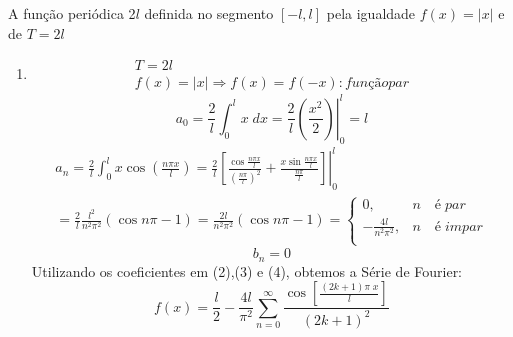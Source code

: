 \documentclass[12pt]{article}
\newcommand*\Eval[3]{\left.#1\right\rvert_{#2}^{#3}}
\begin{document}
\section{}
A função periódica 2$l$ definida no segmento $[-l,l]$ pela igualdade $f(x) = |x|$ e de $T=2l$
\begin{enumerate}[label=S.]
\item
	\begin{equation}
    \begin{split}
    T = 2l\\
    f(x) = |x| \Rightarrow f(x) = f(-x) : função par
    \end{split}\end{equation}
    \begin{equation}
   	a_{0} = \frac{2}{l} \int_{0}^{l} x\; dx = \frac{2}{l} \Eval{\left(\frac{x^{2}}{2}\right)}{0}{l} = l 
    \end{equation}
    \begin{equation} \begin{split}
    a_{n} = \frac{2}{l} \int_{0}^{l} x \cos\left(\frac{n\pi x}{l}\right) = \frac{2}{l} \Eval{\left[\frac{\cos \frac{n\pi x}{l}}{\left(\frac{n\pi}{l}\right)^{2}} + \frac{x\sin \frac{n\pi x}{l}}{\frac{n\pi}{l}}\right]}{0}{l}\\ 
    =\frac{2}{l}\frac{l^{2}}{n^{2}\pi^{2}} (\cos n\pi -1) = \frac{2l}{n^{2}\pi^{2}}(\cos n\pi -1) = 
    \begin{cases}
    0 , & n \quad é\;  par\\
    - \frac{4l}{n^{2}\pi^{2}}, & n \quad é\; impar\\
    \end{cases}
    \end{split}\end{equation}
     \begin{equation}
     b_{n} = 0
     \end{equation}
      Utilizando os coeficientes em (2),(3) e (4), obtemos a Série de Fourier:
      \begin{equation}
     f(x) = \frac{l}{2} - \frac{4l}{\pi^{2}} \sum_{n=0}^{\infty} \frac{\cos \left[\frac{(2k+1)\pi\;x}{l}\right]}{(2k+1)^2} 
     \end{equation}
\end{enumerate}
\end{document}
